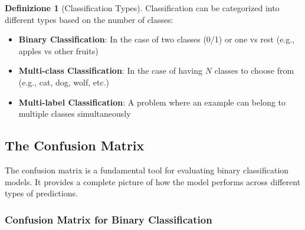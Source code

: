 \documentclass[11pt,a4paper]{article}
\theoremstyle{definition}
\newtheorem{definition}{Definizione}[section]
\theoremstyle{plain}
\theoremstyle{remark}
\begin{document}
\begin{definition}[Classification Types]
Classification can be categorized into different types based on the number of classes:

\begin{itemize}
    \item \textbf{Binary Classification}: In the case of two classes (0/1) or one vs rest (e.g., apples vs other fruits)
    
    \item \textbf{Multi-class Classification}: In the case of having $N$ classes to choose from (e.g., cat, dog, wolf, etc.)
    
    \item \textbf{Multi-label Classification}: A problem where an example can belong to multiple classes simultaneously
\end{itemize}
\end{definition}

\subsection{The Confusion Matrix}

The confusion matrix is a fundamental tool for evaluating binary classification models. It provides a complete picture of how the model performs across different types of predictions.

\subsubsection{Confusion Matrix for Binary Classification}
\end{document}
